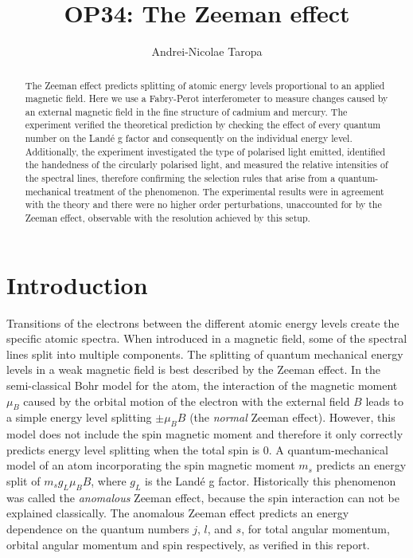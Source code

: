 \documentclass[11pt]{article}
\title{OP34: The Zeeman effect}
\author{Andrei-Nicolae Taropa}
\begin{document}
\maketitle


\begin{abstract}
The Zeeman effect predicts splitting of atomic energy levels proportional to an applied magnetic field. Here we use a Fabry-Perot interferometer to measure changes caused by an external magnetic field in the fine structure of cadmium and mercury. The experiment verified the theoretical prediction by checking the effect of every quantum number on the Landé g factor and consequently on the individual energy level. Additionally, the experiment investigated the type of polarised light emitted, identified the handedness of the circularly polarised light, and measured the relative intensities of the spectral lines, therefore confirming the selection rules that arise from a quantum-mechanical treatment of the phenomenon. The experimental results were in agreement with the theory and there were no higher order perturbations, unaccounted for by the Zeeman effect, observable with the resolution achieved by this setup. 
\end{abstract}


\section{Introduction}
Transitions of the electrons between the different atomic energy levels create the specific atomic spectra. When introduced in a magnetic field, some of the spectral lines split into multiple components. 
The splitting of quantum mechanical energy levels in a weak magnetic field is best described by the Zeeman effect. 
In the semi-classical Bohr model for the atom, the interaction of the magnetic moment $\mu_B$ caused by the orbital motion of the electron with the external field $B$ leads to a simple energy level splitting $\pm \mu_B B$ (the \emph{normal} Zeeman effect). 
However, this model does not include the spin magnetic moment and therefore it only correctly predicts energy level splitting when the total spin is $0$. A quantum-mechanical model of an atom incorporating the spin magnetic moment $m_s$ predicts an energy split of $m_s g_L \mu_B B$, where $g_L$ is the Landé g factor. Historically this phenomenon was called the \emph{anomalous} Zeeman effect, because the spin interaction can not be explained classically. The anomalous Zeeman effect predicts an energy dependence on the quantum numbers $j$, $l$, and $s$, for total angular momentum, orbital angular momentum and spin respectively, as verified in this report.
\end{document}
